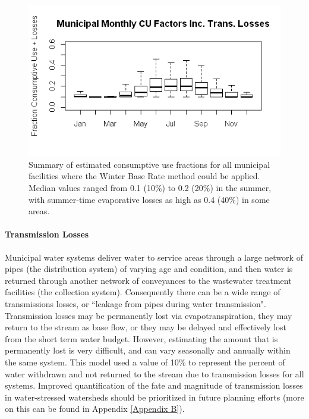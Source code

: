 \vspace{-6mm}
\begin{figure}[H]
\centering
\label{fig:cu_wbr_summary}
\includegraphics[scale=1.0]{sections/Xfigures/cu_wbr_unacc.png}
\caption{Summary of estimated consumptive use fractions for all municipal facilities where the Winter Base Rate method could be applied.  Median values ranged from 0.1 (10\%) to 0.2 (20\%) in the summer, with summer-time evaporative losses as high as 0.4 (40\%) in some areas.}
\end{figure}


\begin{multicols}{2}
\paragraph{Transmission Losses}\mbox{}\smallskip 
\label{sec:cu_tloss}

\noindent Municipal water systems deliver water to service areas through a large network of pipes (the distribution system) of varying age and condition, and then water is returned through another network of conveyances to the wastewater treatment facilities (the collection system).  Consequently there can be a wide range of transmissions losses, or ``leakage from pipes during water transmission".  Transmission losses may be permanently lost via evapotranspiration, they may return to the stream as base flow, or they may be delayed and effectively lost from the short term water budget.  However, estimating the amount that is permanently lost is very difficult, and can vary seasonally and annually within the same system. This model used a value of 10\% to represent the percent of water withdrawn and not returned to the stream due to transmission losses for all systems.  Improved quantification of the fate and magnitude of transmission losses in water-stressed watersheds should be prioritized in future planning efforts (more on this can be found in Appendix \ref{Appendix B}).

\end{multicols}